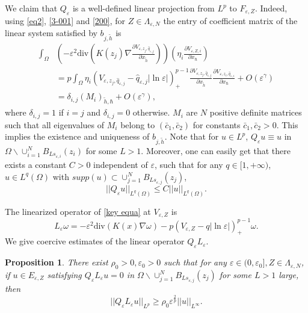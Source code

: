 \documentclass[12pt,reqno]{amsart}
\numberwithin{equation}{section}
\newtheorem{proposition}[theorem]{Proposition}
\theoremstyle{definition}
\theoremstyle{remark}
\begin{document}
We claim that $ Q_\varepsilon $ is a well-defined  linear projection  from $ L^p $ to $ F_{\varepsilon,Z}$. Indeed, using  \eqref{eq2}, \eqref{3-001} and \eqref{200},  for  $ Z\in \Lambda_{\varepsilon, N} $ the entry of coefficient matrix of the linear system satisfied by $b_{j,\tilde{h}}$ is
\begin{equation}\label{coef of C}
\begin{split}
\int_{\Omega}&\left( -\varepsilon^2\text{div}\left (K(z_j)\nabla   \frac{\partial V_{\varepsilon, z_j, \hat{q}_{\varepsilon,j}}}{\partial x_{\tilde{h}}}\right )\right)\left( \eta_i\frac{\partial V_{\varepsilon, Z,i}}{\partial x_\hbar}\right)\\
&=p\int_{\Omega}\eta_i\left (V_{\varepsilon, z_j, \hat{q}_{\varepsilon,j}}-\hat{q}_{\varepsilon,j}|\ln\varepsilon|\right )^{p-1}_+ \frac{\partial V_{\varepsilon, z_j, \hat{q}_{\varepsilon,j}}}{\partial x_{\tilde{h}}}\frac{\partial V_{\varepsilon, z_i, \hat{q}_{\varepsilon,i}}}{\partial x_\hbar}+O\left( \varepsilon^\gamma\right)\\
&=\delta_{i,j}(M_{i})_{\tilde{h},\hbar}+O\left( \varepsilon^\gamma\right) ,
\end{split}
\end{equation}
where $ \delta_{i,j}= 1 $ if $ i = j $ and $ \delta_{i,j}= 0 $ otherwise.  $ M_{i} $ are $ N $ positive definite matrices %
such that all eigenvalues of $ M_{i} $ belong to $ (\bar{c}_1,\bar{c}_2) $ for constants $ \bar{c}_1,\bar{c}_2>0 $.
This implies the existence and uniqueness of $ b_{j,\tilde{h}} $.
Note that for $ u\in L^p $, $ Q_{\varepsilon} u \equiv u $ in $ \Omega \backslash\cup_{i=1}^NB_{Ls_{\varepsilon,i}}(z_{i}) $ for some $ L>1 $. Moreover, one can easily get that there exists a constant $ C>0 $ independent of $ \varepsilon $, such that for any $ q\in[1,+\infty) $, $ u\in L^q(\Omega) $ with $ supp(u)\subset  \cup_{j=1}^NB_{Ls_{\varepsilon,j}}(z_j)$,
\begin{equation*}
||Q_\varepsilon u||_{L^q(\Omega)}\leq C||u||_{L^q(\Omega)}.
\end{equation*}

The linearized operator of \eqref{key equa} at $ V_{\varepsilon, Z} $ is
\begin{equation*}
L_\varepsilon \omega =-\varepsilon^2\text{div}(K(x)\nabla \omega)- p\left (V_{\varepsilon, Z}-q|\ln\varepsilon|\right )^{p-1}_+ \omega.
\end{equation*}
We give  coercive estimates of the linear operator $ Q_\varepsilon L_\varepsilon $.
\begin{proposition}\label{coercive esti}
There exist  $ \rho_0>0, \varepsilon_0>0 $ such that for any $ \varepsilon\in(0,\varepsilon_0],  Z\in \Lambda_{\varepsilon, N} $, if $ u\in E_{\varepsilon,Z} $ satisfying $ Q_\varepsilon L_\varepsilon u=0 $ in $ \Omega\backslash\cup_{j=1}^NB_{Ls_{\varepsilon,j}}(z_j) $ for some $ L>1 $ large, then
\begin{equation*}
||Q_\varepsilon L_\varepsilon u||_{L^p}\geq \rho_0\varepsilon^{\frac{2}{p}}||u||_{L^\infty}. 
\end{equation*}
\end{proposition}
\end{document}
